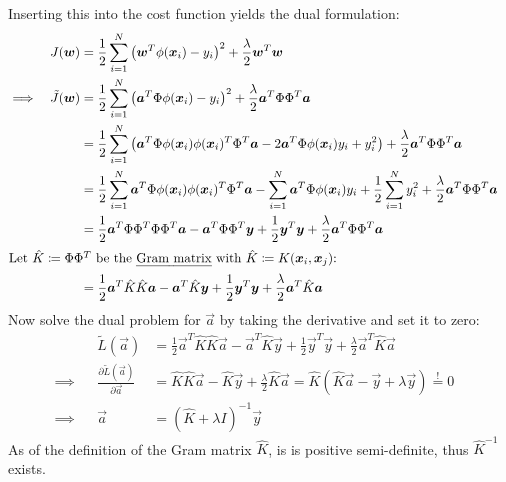 			Inserting this into the cost function yields the dual formulation:
			\begin{align}
				&& J(\vec{w}) &= \frac{1}{2} \sum_{i = 1}^{N} \big( \vec{w}^T \phi(\vec{x}_i) - y_i \big)^2 + \frac{\lambda}{2} \vec{w}^T \vec{w} & \\
				\implies && \tilde{J}(\vec{w}) &= \frac{1}{2} \sum_{i = 1}^{N} \big( \vec{a}^T \Phi \phi(\vec{x}_i) - y_i \big)^2 + \frac{\lambda}{2} \vec{a}^T \Phi \Phi^T \vec{a} & \\
					&& &= \frac{1}{2} \sum_{i = 1}^{N} \big( \vec{a}^T \Phi \phi(\vec{x}_i) \phi(\vec{x}_i)^T \Phi^T \vec{a} - 2 \vec{a}^T \Phi \phi(\vec{x}_i)y_i + y_i^2 \big) + \frac{\lambda}{2} \vec{a}^T \Phi \Phi^T \vec{a} & \\
					&& &= \frac{1}{2} \sum_{i = 1}^{N} \vec{a}^T \Phi \phi(\vec{x}_i) \phi(\vec{x}_i)^T \Phi^T \vec{a} - \sum_{i = 1}^{N} \vec{a}^T \Phi \phi(\vec{x}_i)y_i + \frac{1}{2} \sum_{i = 1}^{N} y_i^2 + \frac{\lambda}{2} \vec{a}^T \Phi \Phi^T \vec{a} & \\
					&& &= \frac{1}{2} \vec{a}^T \Phi \Phi^T \Phi \Phi^T \vec{a} - \vec{a}^T \Phi \Phi^T \vec{y} + \frac{1}{2} \vec{y}^T \vec{y} + \frac{\lambda}{2} \vec{a}^T \Phi \Phi^T \vec{a} & \\
				\intertext{Let \( \hat{K} \coloneqq \Phi\Phi^T \) be the \emph{Gram matrix} with \( \hat{K} \coloneqq K(\vec{x}_i, \vec{x}_j) \):}
				&& &= \frac{1}{2} \vec{a}^T \hat{K} \hat{K} \vec{a} - \vec{a}^T \hat{K} \vec{y} + \frac{1}{2} \vec{y}^T \vec{y} + \frac{\lambda}{2} \vec{a}^T \hat{K} \vec{a} & \\
			\end{align}
			Now solve the dual problem for \(\vec{a}\) by taking the derivative and set it to zero:
			\begin{align}
				&& \tilde{L}(\vec{a}) &= \frac{1}{2} \vec{a}^T \hat{K} \hat{K} \vec{a} - \vec{a}^T \hat{K} \vec{y} + \frac{1}{2} \vec{y}^T \vec{y} + \frac{\lambda}{2} \vec{a}^T \hat{K} \vec{a} & \\
				\implies && \frac{\partial \tilde{L}(\vec{a})}{\partial \vec{a}} &= \hat{K} \hat{K} \vec{a} - \hat{K} \vec{y} + \frac{\lambda}{2} \hat{K} \vec{a} = \hat{K} (\hat{K}\vec{a} - \vec{y} + \lambda\vec{y}) \overset{!}{=} 0 & \\
				\implies && \vec{a} &= (\hat{K} + \lambda I)^{-1} \vec{y}
			\end{align}
			As of the definition of the Gram matrix \(\hat{K}\), is is positive semi-definite, thus \(\hat{K}^{-1}\) exists.
			
